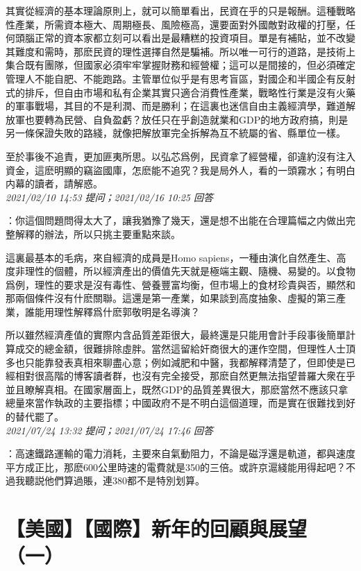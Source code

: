 \documentclass[twocolumn]{ctexart}
\begin{document}
其實從經濟的基本理論原則上，就可以簡單看出，民資在乎的只是報酬。這種戰略性產業，所需資本極大、周期極長、風險極高，還要面對外國敵對政權的打壓，任何頭腦正常的資本家都立刻可以看出是最糟糕的投資項目。單是有補貼，並不改變其難度和需時，那麽民資的理性選擇自然是騙補。所以唯一可行的道路，是技術上集合既有團隊，但國家必須牢牢掌握財務和經營權；這可以是間接的，但必須確定管理人不能自肥、不能跑路。主管單位似乎是有思考盲區，對國企和半國企有反射式的排斥，但自由市場和私有企業其實只適合消費性產業，戰略性行業是沒有火藥的軍事戰場，其目的不是利潤、而是勝利；在這裏也迷信自由主義經濟學，難道解放軍也要轉為民營、自負盈虧？放任只在乎創造就業和GDP的地方政府搞，則是另一條保證失敗的路綫，就像把解放軍完全拆解為互不統屬的省、縣單位一樣。

至於事後不追責，更加匪夷所思。以弘芯爲例，民資拿了經營權，卻違約沒有注入資金，這麽明顯的竊盜國庫，怎麽能不追究？我是局外人，看的一頭霧水；有明白内幕的讀者，請解惑。
\\

\textit{\hfill\noindent\small 2021/02/10 14:53 提问；2021/02/16 10:25 回答}

：你這個問題問得太大了，讓我猶豫了幾天，還是想不出能在合理篇幅之内做出完整解釋的辦法，所以只挑主要重點來談。

這裏最基本的毛病，來自經濟的成員是Homo sapiens，一種由演化自然產生、高度非理性的個體，所以經濟產出的價值先天就是極端主觀、隨機、易變的。以食物爲例，理性的要求是沒有毒性、營養豐富均衡，但市場上的食材珍貴與否，顯然和那兩個條件沒有什麽關聯。這還是第一產業，如果談到高度抽象、虛擬的第三產業，誰能用理性解釋爲什麽郭敬明是名導演？

所以雖然經濟產值的實際内含品質差距很大，最終還是只能用會計手段事後簡單計算成交的總金額，很難排除虛胖。當然這留給奸商很大的運作空間，但理性人士頂多也只能靠發表真相來聊盡心意；例如減肥和中醫，我都解釋清楚了，但即使是已經相對很高階的博客讀者群，也沒有完全接受，那麽自然更無法指望普羅大衆在乎並且瞭解真相。在國家層面上，既然GDP的品質差異很大，那麽當然不應該只拿總量來當作執政的主要指標；中國政府不是不明白這個道理，而是實在很難找到好的替代罷了。
\\

\textit{\hfill\noindent\small 2021/07/24 13:32 提问；2021/07/24 17:46 回答}

：高速鐵路運輸的電力消耗，主要來自氣動阻力，不論是磁浮還是軌道，都與速度平方成正比，那麽600公里時速的電費就是350的三倍。或許京滬綫能用得起吧？不過我聽説他們算過賬，連380都不是特別划算。
\\


\section{【美國】【國際】新年的回顧與展望（一）}
\end{document}
